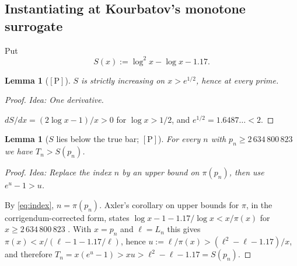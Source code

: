 \documentclass[11pt,a4paper]{article}
\theoremstyle{plain}
\newtheorem{lemma}[theorem]{Lemma}
\theoremstyle{definition}
\theoremstyle{remark}
\newcommand{\idea}[1]{\emph{Idea: #1}\par\smallskip}
\newcommand{\cP}{{[\mathrm{P}]}}
\begin{document}
\subsection{Instantiating at Kourbatov's monotone surrogate}

Put
\[
S(x) := \log^2 x - \log x - 1.17 .
\]

\begin{lemma}[$\cP$]
\label{lem:Smono}
$S$ is strictly increasing on $x > e^{1/2}$, hence at every prime.
\end{lemma}

\begin{proof}
\idea{One derivative.}
$dS/dx = (2\log x - 1)/x > 0$ for $\log x > 1/2$, and $e^{1/2} = 1.6487\ldots < 2$.
\end{proof}

\begin{lemma}[$S$ lies below the true bar; $\cP$]
\label{lem:S2}
For every $n$ with $p_n \ge 2\,634\,800\,823$ we have $T_n > S(p_n)$.
\end{lemma}

\begin{proof}
\idea{Replace the index $n$ by an upper bound on $\pi(p_n)$, then use $e^u - 1 > u$.}
By \eqref{eq:index}, $n = \pi(p_n)$. Axler's corollary on upper bounds for $\pi$, in the
corrigendum-corrected form, states $\log x - 1 - 1.17/\log x < x/\pi(x)$ for
$x \ge 2\,634\,800\,823$ \cite{axler2014newbounds}. With $x = p_n$ and $\ell = L_n$ this gives
$\pi(x) < x/(\ell - 1 - 1.17/\ell)$, hence $u := \ell/\pi(x) > (\ell^2 - \ell - 1.17)/x$, and
therefore $T_n = x(e^u - 1) > x u > \ell^2 - \ell - 1.17 = S(p_n)$.
\end{proof}
\end{document}
